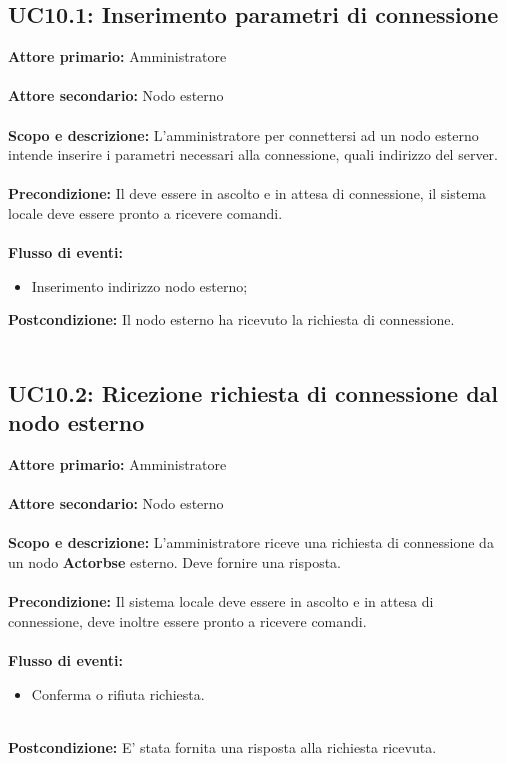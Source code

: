 \documentclass{scalatekids-article}
\begin{document}
\subsection{UC10.1: Inserimento parametri di connessione}
\textbf{Attore primario:} Amministratore \\ \\
\textbf{Attore secondario:} Nodo esterno \\ \\
\textbf{Scopo e descrizione:} L'amministratore per connettersi ad un nodo esterno intende inserire i parametri necessari alla connessione, quali indirizzo del server.\\ \\
\textbf{Precondizione:} Il  deve essere in ascolto e in attesa di connessione, il sistema locale deve essere pronto a ricevere comandi.\\ \\
\textbf{Flusso di eventi:}
\begin{itemize}
\item Inserimento indirizzo nodo esterno;
\end{itemize}
\textbf{Postcondizione:} Il nodo esterno ha ricevuto la richiesta di connessione.\\ \\
\subsection{UC10.2: Ricezione richiesta di connessione dal nodo esterno}
\textbf{Attore primario:} Amministratore\\ \\
\textbf{Attore secondario:} Nodo esterno\\ \\
\textbf{Scopo e descrizione:} L'amministratore riceve una richiesta di connessione da un nodo \textbf{Actorbse} esterno. Deve fornire una risposta.\\ \\
\textbf{Precondizione:} Il sistema locale deve essere in ascolto e in attesa di connessione, deve inoltre essere pronto a ricevere comandi.\\ \\
\textbf{Flusso di eventi:}
\begin{itemize}
\item Conferma o rifiuta richiesta.\\ \\
\end{itemize}
\textbf{Postcondizione:} E' stata fornita una risposta alla richiesta ricevuta.
\end{document}
